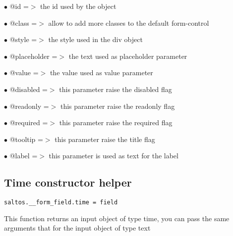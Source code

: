\documentclass[a4paper]{book}
\begin{document}
\begin{compactitem}
\item[\color{myblue}$\bullet$] @id          =$>$ the id used by the object
\item[\color{myblue}$\bullet$] @class       =$>$ allow to add more classes to the default form-control
\item[\color{myblue}$\bullet$] @style       =$>$ the style used in the div object
\item[\color{myblue}$\bullet$] @placeholder =$>$ the text used as placeholder parameter
\item[\color{myblue}$\bullet$] @value       =$>$ the value used as value parameter
\item[\color{myblue}$\bullet$] @disabled    =$>$ this parameter raise the disabled flag
\item[\color{myblue}$\bullet$] @readonly    =$>$ this parameter raise the readonly flag
\item[\color{myblue}$\bullet$] @required    =$>$ this parameter raise the required flag
\item[\color{myblue}$\bullet$] @tooltip     =$>$ this parameter raise the title flag
\item[\color{myblue}$\bullet$] @label       =$>$ this parameter is used as text for the label
\end{compactitem}

\hypertarget{toc380}{}
\subsection{Time constructor helper}

\begin{lstlisting}
saltos.__form_field.time = field
\end{lstlisting}

This function returns an input object of type time, you can pass the same arguments
that for the input object of type text
\end{document}

